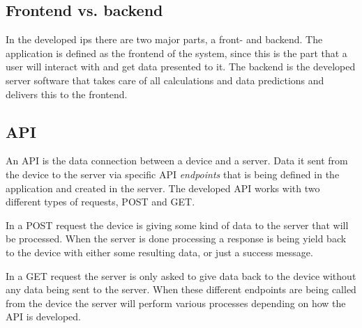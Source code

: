 \subsection{Frontend vs. backend}\label{sec:implArchitectureFrontBack}
In the developed \acrfull{ips} there are two major parts, a front- and backend.
The application is defined as the frontend of the system, since this is the part that a user will interact with and get data presented to it. 
The backend is the developed server software that takes care of all calculations and data predictions and delivers this to the frontend.


\subsection{API}\label{sec:implArchitectureApi}
An API is the data connection between a device and a server.
Data it sent from the device to the server via specific API \textit{endpoints} that is being defined in the application and created in the server.
The developed API works with two different types of requests, POST and GET.

\bigskip

In a POST request the device is giving some kind of data to the server that will be processed.
When the server is done processing a response is being yield back to the device with either some resulting data, or just a success message.

\bigskip

In a GET request the server is only asked to give data back to the device without any data being sent to the server.
When these different endpoints are being called from the device the server will perform various processes depending on how the API is developed.

